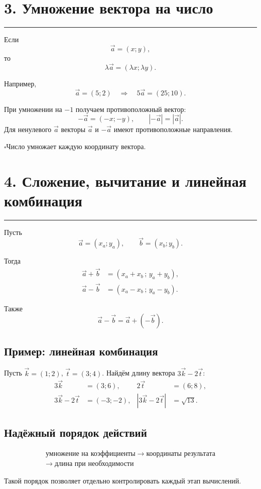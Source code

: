 \documentclass[a4paper,12pt]{article}
\newcommand{\vct}[1]{\vec{#1}}
\newcommand{\modv}[1]{\left|#1\right|}
\newcommand{\sectionline}{%
    \vspace{0.1em}
    {\color{accent}\rule{\linewidth}{0.6pt}}
    \vspace{0.3em}
}
\newcommand{\topic}[1]{%
    \Needspace{7\baselineskip}%
    \section*{\color{darkaccent}#1}
    \sectionline
}
\newcommand{\checkitem}[1]{%
    \par\noindent
    {\color{accent}\(\square\)}\;#1\par
}
\begin{document}
\topic{3. Умножение вектора на число}

Если
\[
\vct a=(x;y),
\]
то
\[
\boxed{
\lambda\vct a=(\lambda x;\lambda y)
}.
\]

Например,
\[
\vct a=(5;2)
\quad\Longrightarrow\quad
5\vct a=(25;10).
\]

При умножении на \(-1\) получаем противоположный вектор:
\[
-\vct a=(-x;-y),
\qquad
\modv{-\vct a}=\modv{\vct a}.
\]
Для ненулевого \(\vct a\) векторы \(\vct a\) и \(-\vct a\) имеют противоположные направления.

\checkitem{Число умножает каждую координату вектора.}

\topic{4. Сложение, вычитание и линейная комбинация}

Пусть
\[
\vct a=(x_a;y_a),
\qquad
\vct b=(x_b;y_b).
\]

Тогда
\[
\boxed{
\begin{aligned}
\vct a+\vct b&=(x_a+x_b\,;\,y_a+y_b),\\
\vct a-\vct b&=(x_a-x_b\,;\,y_a-y_b).
\end{aligned}
}
\]

Также
\[
\vct a-\vct b=\vct a+(-\vct b).
\]

\subsection*{\color{darkaccent}Пример: линейная комбинация}

Пусть \(\vct k=(1;2)\), \(\vct t=(3;4)\). Найдём длину вектора \(3\vct k-2\vct t\):
\[
\begin{aligned}
3\vct k&=(3;6),
&2\vct t&=(6;8),\\
3\vct k-2\vct t&=(-3;-2),
&\modv{3\vct k-2\vct t}&=\sqrt{13}.
\end{aligned}
\]

\subsection*{\color{darkaccent}Надёжный порядок действий}

\[
\boxed{
\begin{gathered}
\text{умножение на коэффициенты}
\;\longrightarrow\;
\text{координаты результата}\\
\longrightarrow\;
\text{длина при необходимости}
\end{gathered}
}
\]

Такой порядок позволяет отдельно контролировать каждый этап вычислений.

\clearpage
\thispagestyle{fancy}
\end{document}
